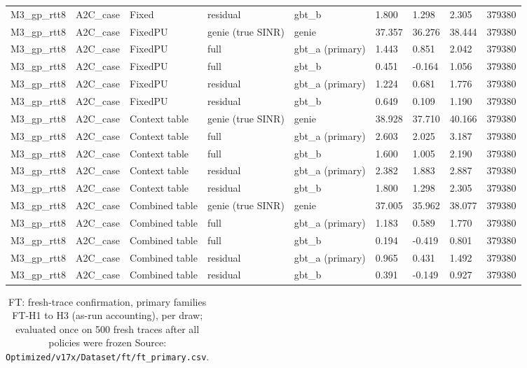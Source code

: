 \documentclass[10pt]{article}
\begin{document}
\begin{landscape}
\begin{longtable}{@{}lllllllll@{}}
M3\_gp\_rtt8 & A2C\_case & Fixed & residual & gbt\_b & 1.800 & 1.298 & 2.305 & 379380 \\
M3\_gp\_rtt8 & A2C\_case & FixedPU & genie (true SINR) & genie & 37.357 & 36.276 & 38.444 & 379380 \\
M3\_gp\_rtt8 & A2C\_case & FixedPU & full & gbt\_a (primary) & 1.443 & 0.851 & 2.042 & 379380 \\
M3\_gp\_rtt8 & A2C\_case & FixedPU & full & gbt\_b & 0.451 & -0.164 & 1.056 & 379380 \\
M3\_gp\_rtt8 & A2C\_case & FixedPU & residual & gbt\_a (primary) & 1.224 & 0.681 & 1.776 & 379380 \\
M3\_gp\_rtt8 & A2C\_case & FixedPU & residual & gbt\_b & 0.649 & 0.109 & 1.190 & 379380 \\
M3\_gp\_rtt8 & A2C\_case & Context table & genie (true SINR) & genie & 38.928 & 37.710 & 40.166 & 379380 \\
M3\_gp\_rtt8 & A2C\_case & Context table & full & gbt\_a (primary) & 2.603 & 2.025 & 3.187 & 379380 \\
M3\_gp\_rtt8 & A2C\_case & Context table & full & gbt\_b & 1.600 & 1.005 & 2.190 & 379380 \\
M3\_gp\_rtt8 & A2C\_case & Context table & residual & gbt\_a (primary) & 2.382 & 1.883 & 2.887 & 379380 \\
M3\_gp\_rtt8 & A2C\_case & Context table & residual & gbt\_b & 1.800 & 1.298 & 2.305 & 379380 \\
M3\_gp\_rtt8 & A2C\_case & Combined table & genie (true SINR) & genie & 37.005 & 35.962 & 38.077 & 379380 \\
M3\_gp\_rtt8 & A2C\_case & Combined table & full & gbt\_a (primary) & 1.183 & 0.589 & 1.770 & 379380 \\
M3\_gp\_rtt8 & A2C\_case & Combined table & full & gbt\_b & 0.194 & -0.419 & 0.801 & 379380 \\
M3\_gp\_rtt8 & A2C\_case & Combined table & residual & gbt\_a (primary) & 0.965 & 0.431 & 1.492 & 379380 \\
M3\_gp\_rtt8 & A2C\_case & Combined table & residual & gbt\_b & 0.391 & -0.149 & 0.927 & 379380 \\
\bottomrule
\end{longtable}
\normalsize
\tiny
\setlength{\tabcolsep}{2pt}
\begin{longtable}{@{}lllllllllllllll@{}}
\caption{FT: fresh-trace confirmation, primary families FT-H1 to H3 (as-run accounting), per draw; evaluated once on 500 fresh traces after all policies were frozen Source: \texttt{Optimized/v17x/Dataset/ft/ft\_primary.csv}.}\\

\end{longtable}
\end{landscape}
\end{document}
